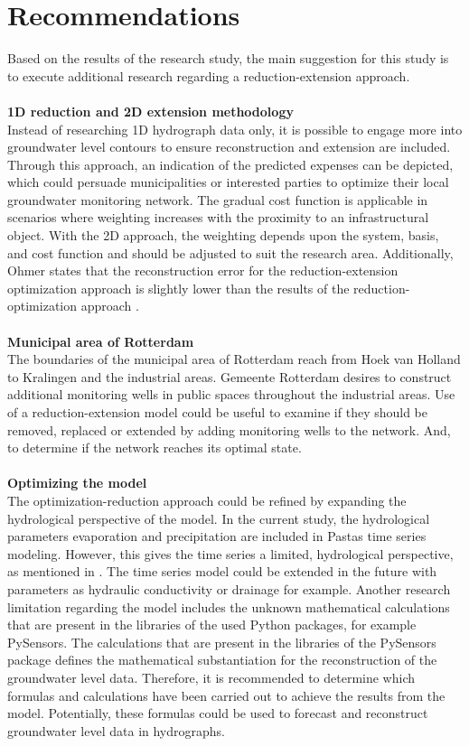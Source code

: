 \chapter{Recommendations}
\label{chapter:recommendations}

Based on the results of the research study, the main suggestion for this study is to execute additional research regarding a reduction-extension approach.\\
\\
\textbf{1D reduction and 2D extension methodology}\\
Instead of researching 1D hydrograph data only, it is possible to engage more into groundwater level contours to ensure reconstruction and extension are included. Through this approach, an indication of the predicted expenses can be depicted, which could persuade municipalities or interested parties to optimize their local groundwater monitoring network. The gradual cost function is applicable in scenarios where weighting increases with the proximity to an infrastructural object. With the 2D approach, the weighting depends upon the system, basis, and cost function and should be adjusted to suit the research area. Additionally, Ohmer states that the reconstruction error for the reduction-extension optimization approach is slightly lower than the results of the reduction-optimization approach \cite{ohmer-2019}. \\
\\
\textbf{Municipal area of Rotterdam}\\
The boundaries of the municipal area of Rotterdam reach from Hoek van Holland to Kralingen and the industrial areas. Gemeente Rotterdam desires to construct additional monitoring wells in public spaces throughout the industrial areas. Use of a reduction-extension model could be useful to examine if they should be removed, replaced or extended by adding monitoring wells to the network. And, to determine if the network reaches its optimal state. \\
\\
\textbf{Optimizing the model}\\
The optimization-reduction approach could be refined by expanding the hydrological perspective of the model. In the current study, the hydrological parameters evaporation and precipitation are included in Pastas time series modeling. However, this gives the time series a limited, hydrological perspective, as mentioned in . The time series model could be extended in the future with parameters as hydraulic conductivity or drainage for example. Another research limitation regarding the model includes the unknown mathematical calculations that are present in the libraries of the used Python packages, for example PySensors. The calculations that are present in the libraries of  the PySensors package defines the mathematical substantiation for the reconstruction of the groundwater level data. Therefore, it is recommended to determine which formulas and calculations have been carried out to achieve the results from the model. Potentially, these formulas could be used to forecast and reconstruct groundwater level data in hydrographs. 



